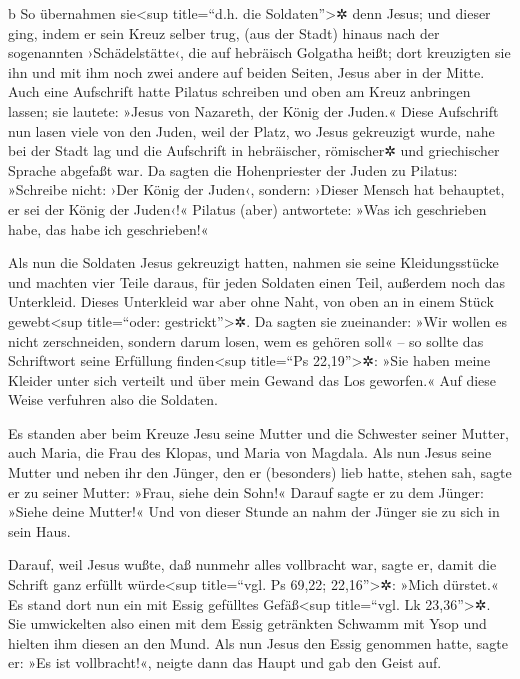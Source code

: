 b So übernahmen sie\textless sup title=``d.h. die
Soldaten''\textgreater✲ denn Jesus;  und dieser ging,
indem er sein Kreuz selber trug, (aus der Stadt) hinaus nach der
sogenannten ›Schädelstätte‹, die auf hebräisch Golgatha heißt;
 dort kreuzigten sie ihn und mit ihm noch zwei andere auf
beiden Seiten, Jesus aber in der Mitte.  Auch eine
Aufschrift hatte Pilatus schreiben und oben am Kreuz anbringen lassen;
sie lautete: »Jesus von Nazareth, der König der Juden.« 
Diese Aufschrift nun lasen viele von den Juden, weil der Platz, wo Jesus
gekreuzigt wurde, nahe bei der Stadt lag und die Aufschrift in
hebräischer, römischer✲ und griechischer Sprache abgefaßt war.
 Da sagten die Hohenpriester der Juden zu Pilatus:
»Schreibe nicht: ›Der König der Juden‹, sondern: ›Dieser Mensch hat
behauptet, er sei der König der Juden‹!«  Pilatus (aber)
antwortete: »Was ich geschrieben habe, das habe ich geschrieben!«

 Als nun die Soldaten Jesus gekreuzigt hatten, nahmen sie
seine Kleidungsstücke und machten vier Teile daraus, für jeden Soldaten
einen Teil, außerdem noch das Unterkleid. Dieses Unterkleid war aber
ohne Naht, von oben an in einem Stück gewebt\textless sup title=``oder:
gestrickt''\textgreater✲.  Da sagten sie zueinander: »Wir
wollen es nicht zerschneiden, sondern darum losen, wem es gehören soll«
-- so sollte das Schriftwort seine Erfüllung finden\textless sup
title=``Ps 22,19''\textgreater✲: »Sie haben meine Kleider unter sich
verteilt und über mein Gewand das Los geworfen.« Auf diese Weise
verfuhren also die Soldaten.

 Es standen aber beim Kreuze Jesu seine Mutter und die
Schwester seiner Mutter, auch Maria, die Frau des Klopas, und Maria von
Magdala.  Als nun Jesus seine Mutter und neben ihr den
Jünger, den er (besonders) lieb hatte, stehen sah, sagte er zu seiner
Mutter: »Frau, siehe dein Sohn!«  Darauf sagte er zu dem
Jünger: »Siehe deine Mutter!« Und von dieser Stunde an nahm der Jünger
sie zu sich in sein Haus.

 Darauf, weil Jesus wußte, daß nunmehr alles vollbracht
war, sagte er, damit die Schrift ganz erfüllt würde\textless sup
title=``vgl. Ps 69,22; 22,16''\textgreater✲: »Mich dürstet.«
 Es stand dort nun ein mit Essig gefülltes
Gefäß\textless sup title=``vgl. Lk 23,36''\textgreater✲. Sie umwickelten
also einen mit dem Essig getränkten Schwamm mit Ysop und hielten ihm
diesen an den Mund.  Als nun Jesus den Essig genommen
hatte, sagte er: »Es ist vollbracht!«, neigte dann das Haupt und gab den
Geist auf.

